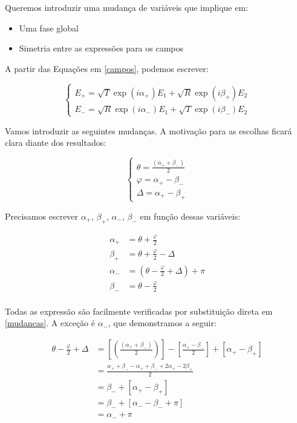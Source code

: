 \documentclass[12pt,a4paper]{report}
\begin{document}
Queremos introduzir uma mudança de variáveis que implique em:

\begin{itemize}
    \item Uma fase global
    \item Simetria entre as expressões para os campos
\end{itemize}

A partir das Equações em \ref{campos}, podemos escrever:

\begin{equation}
    \begin{cases}
        E_+=\sqrt{T}\exp(i\alpha_+)E_1+\sqrt{R}\exp(i\beta_+)E_2\\
        E_-=\sqrt{R}\exp(i\alpha_-)E_1+\sqrt{T}\exp(i\beta_-)E_2
    \end{cases}
    \label{campos}
\end{equation}

Vamos introduzir as seguintes mudanças. A motivação para as escolhas ficará clara diante dos resultados:

\begin{equation}
    \begin{cases}
        \theta=\frac{(\alpha_++\beta_-)}{2}\\[0.3cm]
        \varphi=\alpha_+-\beta_-\\
        \Delta=\alpha_+-\beta_+
    \end{cases}
    \label{mudancas}
\end{equation}

Precisamos escrever $\alpha_+$, $\beta_+$, $\alpha_-$, $\beta_-$ em função dessas variáveis:

\begin{align*}
\alpha_+     & = \theta+\frac{\varphi}{2}\\[0.3cm]
\beta_+      & = \theta+\frac{\varphi}{2}-\Delta\\[0.3cm]
\alpha_-     & = (\theta-\frac{\varphi}{2}+\Delta)+\pi\\[0.3cm]
\beta_-      & = \theta-\frac{\varphi}{2}\\
\end{align*}

Todas as expressão são facilmente verificadas por substituição direta em \ref{mudancas}. A exceção é $\alpha_-$, que demonstramos a seguir:

\begin{align*}
\theta-\frac{\varphi}{2}+\Delta & =[(\frac{(\alpha_++\beta_-)}{2})]-[\frac{\alpha_+-\beta_-}{2}]+[\alpha_+-\beta_+]\\
            & = \frac{\alpha_++\beta_--\alpha_++\beta_-+2\alpha_+-2\beta_+}{2}\\
            & = \beta_-+[\alpha_+-\beta_+]\\
            & = \beta_-+[\alpha_--\beta_-+\pi]\\
            & = \alpha_-+\pi\\
\end{align*}
\end{document}
